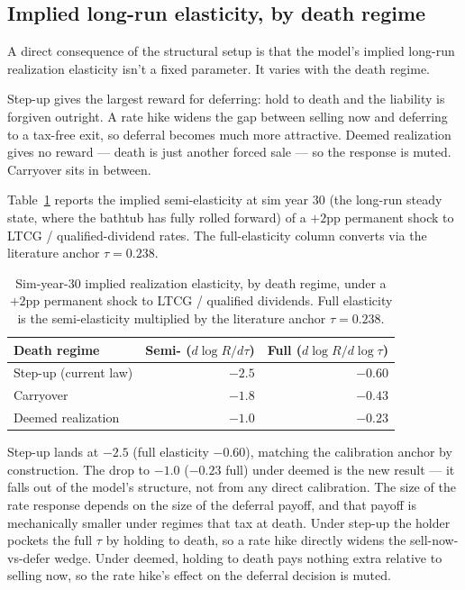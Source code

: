 \documentclass[11pt]{article}
\begin{document}
\subsection{Implied long-run elasticity, by death regime}
\label{sec:implied_elasticity}

A direct consequence of the structural setup is that the model's
implied long-run realization elasticity isn't a fixed parameter. It
varies with the death regime.

Step-up gives the largest reward for deferring: hold to death and the
liability is forgiven outright. A rate hike widens the gap between
selling now and deferring to a tax-free exit, so deferral becomes much
more attractive. Deemed realization gives no reward --- death is just
another forced sale --- so the response is muted. Carryover sits in
between.

Table~\ref{tab:implied_elast} reports the implied semi-elasticity at sim
year 30 (the long-run steady state, where the bathtub has fully rolled
forward) of a $+2$pp permanent shock to LTCG / qualified-dividend rates.
The full-elasticity column converts via the literature anchor
$\tau = 0.238$.

\begin{table}[H]
\centering\small
\caption{Sim-year-30 implied realization elasticity, by death regime,
         under a $+2$pp permanent shock to LTCG / qualified dividends.
         Full elasticity is the semi-elasticity multiplied by the
         literature anchor $\tau = 0.238$.}
\label{tab:implied_elast}
\begin{tabular}{lrr}
\toprule
Death regime           & Semi- ($d\log R / d\tau$) & Full ($d\log R / d\log\tau$) \\
\midrule
Step-up (current law)  & $-2.5$                    & $-0.60$ \\
Carryover              & $-1.8$                    & $-0.43$ \\
Deemed realization     & $-1.0$                    & $-0.23$ \\
\bottomrule
\end{tabular}
\end{table}

Step-up lands at $-2.5$ (full elasticity $-0.60$), matching the
calibration anchor by construction. The drop to $-1.0$ ($-0.23$ full)
under deemed is the new result --- it falls out of the model's
structure, not from any direct calibration. The size of the rate
response depends on the size of the deferral payoff, and that payoff is
mechanically smaller under regimes that tax at death. Under step-up the
holder pockets the full $\tau$ by holding to death, so a rate hike
directly widens the sell-now-vs-defer wedge. Under deemed, holding to
death pays nothing extra relative to selling now, so the rate hike's
effect on the deferral decision is muted.
\end{document}
